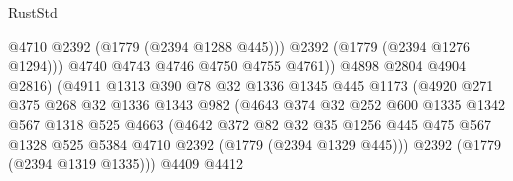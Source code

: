 \begin{lexlean}{RustStd}
\begin{coremodule}
                                        @4710
                                        @2392
                                        (@1779 (@2394 @1288 @445)))
                                      @2392
                                      (@1779 (@2394 @1276 @1294)))
                                    @4740
                                    @4743
                                    @4746
                                    @4750
                                    @4755
                                    @4761))
                                @4898
                                @2804
                                @4904
                                @2816)
                              (@4911
                                @1313
                                @390
                                @78
                                @32
                                @1336
                                @1345
                                @445
                                @1173
                                (@4920
                                  @271
                                  @375
                                  @268
                                  @32
                                  @1336
                                  @1343
                                  @982
                                  (@4643
                                    @374
                                    @32
                                    @252
                                    @600
                                    @1335
                                    @1342
                                    @567
                                    @1318
                                    @525
                                    @4663
                                    (@4642
                                      @372
                                      @82
                                      @32
                                      @35
                                      @1256
                                      @445
                                      @475
                                      @567
                                      @1328
                                      @525
                                      @5384
                                      @4710
                                      @2392
                                      (@1779 (@2394 @1329 @445)))
                                    @2392
                                    (@1779 (@2394 @1319 @1335)))
                                  @4409
                                  @4412

\end{coremodule}
\end{lexlean}
